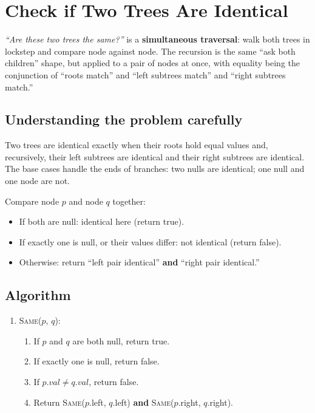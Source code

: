 \section{Check if Two Trees Are Identical}
\label{sec:trees-same}


\begin{patternbox}
\emph{``Are these two trees the same?''} is a \textbf{simultaneous
traversal}: walk both trees in lockstep and compare node against node. The
recursion is the same ``ask both children'' shape, but applied to a pair
of nodes at once, with equality being the conjunction of ``roots match''
and ``left subtrees match'' and ``right subtrees match.''
\end{patternbox}

\subsection*{Understanding the problem carefully}

Two trees are identical exactly when their roots hold equal values and,
recursively, their left subtrees are identical and their right subtrees
are identical. The base cases handle the ends of branches: two nulls are
identical; one null and one node are not.

\begin{ideabox}
Compare node $p$ and node $q$ together:
\begin{itemize}
  \item If both are null: identical here (return true).
  \item If exactly one is null, or their values differ: not identical
        (return false).
  \item Otherwise: return ``left pair identical'' \textbf{and} ``right
        pair identical.''
\end{itemize}
\end{ideabox}

\subsection*{Algorithm}

\begin{enumerate}
  \item \textsc{Same}($p$, $q$):
  \begin{enumerate}
    \item If $p$ and $q$ are both null, return true.
    \item If exactly one is null, return false.
    \item If $p.val \ne q.val$, return false.
    \item Return \textsc{Same}($p$.left, $q$.left) \textbf{and}
          \textsc{Same}($p$.right, $q$.right).
  \end{enumerate}
\end{enumerate}

